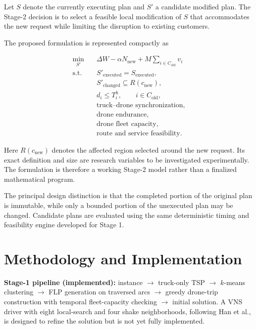 \documentclass[10pt,a4paper]{article}
\begin{document}
Let $S$ denote the currently executing plan and $S'$ a candidate
modified plan. The Stage-2 decision is to select a feasible local
modification of $S$ that accommodates the new request while limiting
the disruption to existing customers.

The proposed formulation is represented compactly as

\begin{equation}
\begin{aligned}
\min_{S'}\quad
&\Delta W-\alpha N_{\mathrm{new}}
 +M\sum_{i\in C_{\mathrm{old}}}v_i \\[1mm]
\text{s.t.}\quad
&S'_{\mathrm{executed}}=S_{\mathrm{executed}},\\
&S'_{\mathrm{changed}}\subseteq R(c_{\mathrm{new}}),\\
&d_i\leq T_i^h,
\qquad i\in C_{\mathrm{old}},\\
&\text{truck--drone synchronization},\\
&\text{drone endurance},\\
&\text{drone fleet capacity},\\
&\text{route and service feasibility}.
\end{aligned}
\label{eq:formulation}
\end{equation}

Here $R(c_{\mathrm{new}})$ denotes the affected region selected around
the new request. Its exact definition and size are research variables
to be investigated experimentally. The formulation is therefore a
working Stage-2 model rather than a finalized mathematical program.

The principal design distinction is that the completed portion of the
original plan is immutable, while only a bounded portion of the
unexecuted plan may be changed. Candidate plans are evaluated using
the same deterministic timing and feasibility engine developed for
Stage 1.

\section{Methodology and Implementation}

\textbf{Stage-1 pipeline (implemented):}
instance $\rightarrow$ truck-only TSP $\rightarrow$ $k$-means clustering
$\rightarrow$ FLP generation on traversed arcs $\rightarrow$ greedy
drone-trip construction with temporal fleet-capacity checking
$\rightarrow$ initial solution. A VNS driver with eight local-search
and four shake neighborhoods, following Han et al., is designed to
refine the solution but is not yet fully implemented.
\end{document}

